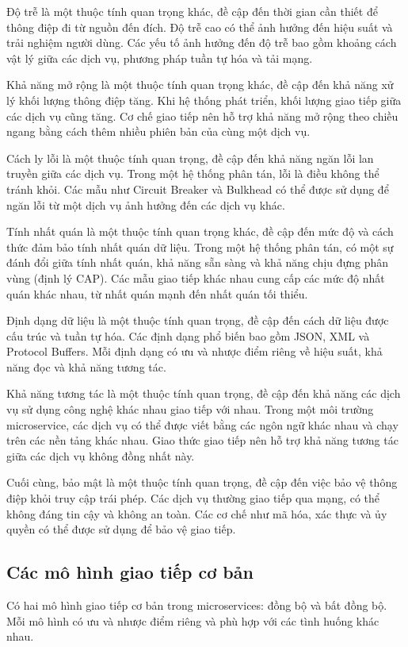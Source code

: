 Độ trễ là một thuộc tính quan trọng khác, đề cập đến thời gian cần thiết để thông điệp đi từ nguồn đến đích. Độ trễ cao có thể ảnh hưởng đến hiệu suất và trải nghiệm người dùng. Các yếu tố ảnh hưởng đến độ trễ bao gồm khoảng cách vật lý giữa các dịch vụ, phương pháp tuần tự hóa và tải mạng.

Khả năng mở rộng là một thuộc tính quan trọng khác, đề cập đến khả năng xử lý
khối lượng thông điệp tăng. Khi hệ thống phát triển, khối lượng giao tiếp giữa
các dịch vụ cũng tăng. Cơ chế giao tiếp nên hỗ trợ khả năng mở rộng theo chiều
ngang bằng cách thêm nhiều phiên bản của cùng một dịch vụ.

Cách ly lỗi là một thuộc tính quan trọng, đề cập đến khả năng ngăn lỗi lan
truyền giữa các dịch vụ. Trong một hệ thống phân tán, lỗi là điều không thể
tránh khỏi. Các mẫu như Circuit Breaker và Bulkhead có thể được sử dụng để ngăn
lỗi từ một dịch vụ ảnh hưởng đến các dịch vụ khác.

Tính nhất quán là một thuộc tính quan trọng khác, đề cập đến mức độ và cách
thức đảm bảo tính nhất quán dữ liệu. Trong một hệ thống phân tán, có một sự
đánh đổi giữa tính nhất quán, khả năng sẵn sàng và khả năng chịu đựng phân vùng
(định lý CAP). Các mẫu giao tiếp khác nhau cung cấp các mức độ nhất quán khác
nhau, từ nhất quán mạnh đến nhất quán tối thiểu.

Định dạng dữ liệu là một thuộc tính quan trọng, đề cập đến cách dữ liệu được cấu trúc và tuần tự hóa. Các định dạng phổ biến bao gồm JSON, XML và Protocol Buffers. Mỗi định dạng có ưu và nhược điểm riêng về hiệu suất, khả năng đọc và khả năng tương tác.

Khả năng tương tác là một thuộc tính quan trọng, đề cập đến khả năng các dịch
vụ sử dụng công nghệ khác nhau giao tiếp với nhau. Trong một môi trường
microservice, các dịch vụ có thể được viết bằng các ngôn ngữ khác nhau và chạy
trên các nền tảng khác nhau. Giao thức giao tiếp nên hỗ trợ khả năng tương tác
giữa các dịch vụ không đồng nhất này.

Cuối cùng, bảo mật là một thuộc tính quan trọng, đề cập đến việc bảo vệ thông
điệp khỏi truy cập trái phép. Các dịch vụ thường giao tiếp qua mạng, có thể
không đáng tin cậy và không an toàn. Các cơ chế như mã hóa, xác thực và ủy
quyền có thể được sử dụng để bảo vệ giao tiếp.

\subsection{Các mô hình giao tiếp cơ bản}
Có hai mô hình giao tiếp cơ bản trong microservices: đồng bộ và bất đồng bộ.
Mỗi mô hình có ưu và nhược điểm riêng và phù hợp với các tình huống khác nhau.

